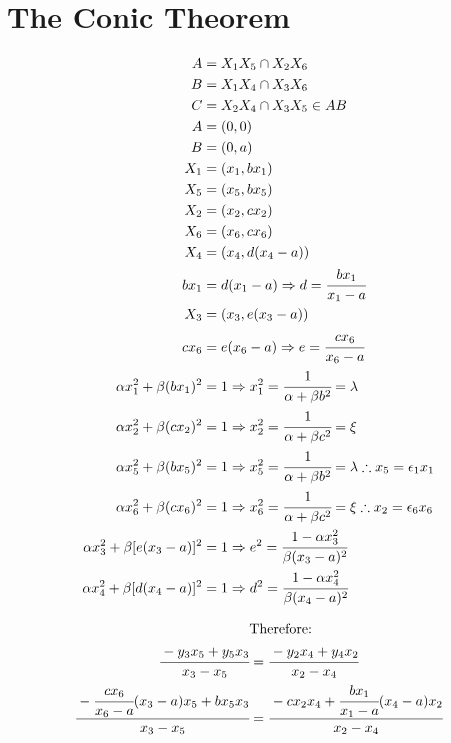 



\section{The Conic Theorem}

\begin{align}
A &= X_1 X_5 \cap X_2 X_6 \\
B &= X_1 X_4 \cap X_3 X_6 \\
C &= X_2 X_4 \cap X_3 X_5 \in AB \label{eq3} \\
A &= (0,0) \\
B &= (0,a) \\
X_1 &= (x_1, bx_1) \\
X_5 &= (x_5, bx_5) \\
X_2 &= (x_2, cx_2) \\
X_6 &= (x_6, cx_6) \\
X_4 &= (x_4, d(x_4 - a)) \\
bx_1 &= d(x_1 - a) \Rightarrow d = \cfrac{b x_1}{x_1 - a} \\
X_3 &= (x_3, e(x_3 - a)) \\
cx_6 &= e(x_6 - a) \Rightarrow e = \cfrac{cx_6}{x_6 - a} \\
\alpha x_1^2 + \beta (bx_1)^2 &= 1 \Rightarrow x_1^2 = \cfrac{1}{\alpha + \beta b^2} = \lambda \\
\alpha x_2^2 + \beta (cx_2)^2 &= 1 \Rightarrow  x_2^2 =\cfrac{1}{\alpha + \beta c^2} = \xi\\  
\alpha x_5^2 + \beta (bx_5)^2 &= 1\Rightarrow x_5^2 = \cfrac{1}{\alpha + \beta b^2} = \lambda \therefore x_5 = \epsilon_1 x_1 \\
\alpha x_6^2 + \beta (cx_6)^2 &= 1 \Rightarrow  x_6^2 =\cfrac{1}{\alpha + \beta c^2} = \xi \therefore x_2 = \epsilon_6 x_6\\
\alpha x_3^2 + \beta [e(x_3-a)]^2 &= 1 \Rightarrow e^2 = \cfrac{1 - \alpha x_3^2 }{\beta (x_3-a)^2} \label{eq18}\\
\alpha x_4^2 + \beta [d(x_4-a)]^2 &= 1 \Rightarrow d^2 = \cfrac{1 - \alpha x_4^2 }{\beta (x_4-a)^2} \label{eq19}
\end{align}

\begin{align}
&\text{Therefore:} \nonumber \\
\cfrac{-y_3 x_5 + y_5 x_3}{x_3 - x_5} &= \cfrac{-y_2 x_4 + y_4 x_2}{x_2 - x_4} \label{eq20} \\
\cfrac{-\cfrac{cx_6}{x_6 - a}(x_3-a) x_5 + b x_5 x_3}{x_3 - x_5} &= \cfrac{-cx_2 x_4 + \cfrac{bx_1}{x_1 - a}(x_4-a) x_2}{x_2 - x_4} 
\end{align}

